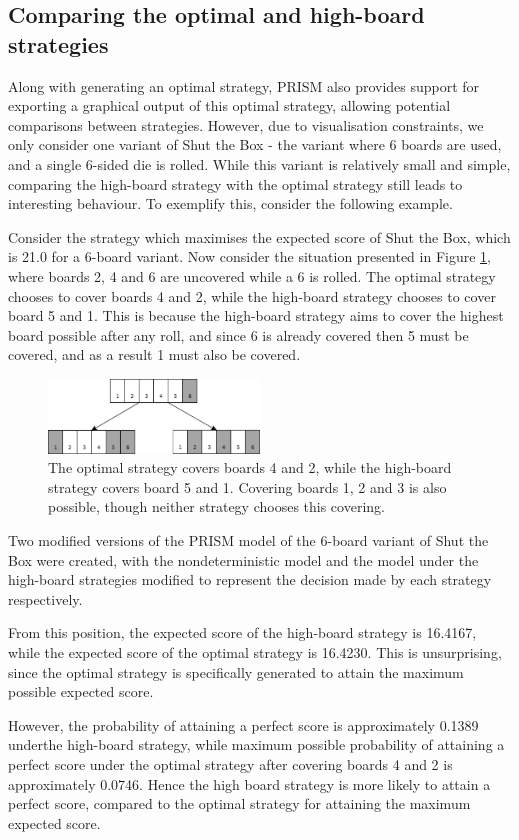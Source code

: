 \subsection{Comparing the optimal and high-board strategies}
\label{cs1:compare-strats}
Along with generating an optimal strategy, PRISM also provides support for exporting a graphical output of this optimal strategy, allowing potential comparisons between strategies. However, due to visualisation constraints, we only consider one variant of Shut the Box - the variant where 6 boards are used, and a single 6-sided die is rolled. While this variant is relatively small and simple, comparing the high-board strategy with the optimal strategy still leads to interesting behaviour. To exemplify this, consider the following example.

\begin{example}
\label{cs1:greedy-optimal}

Consider the strategy which maximises the expected score of Shut the Box, which is 21.0 for a 6-board variant. Now consider the situation presented in Figure \ref{cs1:optimal_high_board}, where boards 2, 4 and 6 are uncovered while a 6 is rolled. The optimal strategy chooses to cover boards 4 and 2, while the high-board strategy chooses to cover board 5 and 1. This is because the high-board strategy aims to cover the highest board possible after any roll, and since 6 is already covered then 5 must be covered, and as a result 1 must also be covered.

\begin{figure}
    \centering
    \includegraphics[width=0.5\textwidth]{images/ShutTheBox/optimal_high_board.pdf}
    \caption{The optimal strategy covers boards 4 and 2, while the high-board strategy covers board 5 and 1. Covering boards 1, 2 and 3 is also possible, though neither strategy chooses this covering.}
\label{cs1:optimal_high_board}
\end{figure}

Two modified versions of the PRISM model of the 6-board variant of Shut the Box were created, with the nondeterministic model and the model under the high-board strategies modified to represent the decision made by each strategy respectively.

From this position, the expected score of the high-board strategy is 16.4167, while the expected score of the optimal strategy is 16.4230. This is unsurprising, since the optimal strategy is specifically generated to attain the maximum possible expected score.

However, the probability of attaining a perfect score is approximately 0.1389 underthe high-board strategy, while maximum possible probability of attaining a perfect score under the optimal strategy after covering boards 4 and 2 is approximately 0.0746. Hence the high board strategy is more likely to attain a perfect score, compared to the optimal strategy for attaining the maximum expected score.
\end{example}

